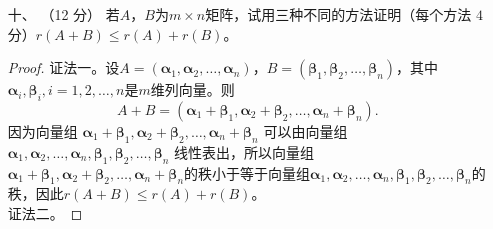\begin{enumerate}[1~]
\begin{proof}
任取一个向量$\boldsymbol{\alpha}\in V_{\lambda}$，有\[
(\mathscr{A}-\lambda E)^{k}(\mathscr{A}\boldsymbol{\alpha})=\mathscr{A}(\mathscr{A}-\lambda E)^{k}\boldsymbol{\alpha}=0.
\]
因此$\mathscr{A}\boldsymbol{\alpha}\in V_{\lambda}$，所以$V_{\lambda}$为$\mathscr{A}$的不变子空间。

(3) 先证明$\lambda$是$\mathscr{A}$在$V_{\lambda}$上的特征值。这只需证明$\Ker(\mathscr{A}-\lambda E)\subset V_{\lambda}$。注意到对任意的$k\ge 1$，\[
\Ker(\mathscr{A}-\lambda E)\subset \Ker(\mathscr{A}-\lambda E)^k.
\]
因此，$\Ker(\mathscr{A}-\lambda E)\subset V_{\lambda}$。\\
再设存在复数$\mu\ne\lambda$是$\mathscr{A}$在$V_{\lambda}$上的特征值。因为对任意的$k\ge 1$，$x-\mu$与$(x-\lambda)^k$互素，因此存在$f(x), g(x)\in\mathbb{C}[x]$，使得\[
f(x)(x-\mu)+g(x)(x-\lambda)^k=1.
\]
任取一个$\mathscr{A}$的属于$\mu$的特征向量$\u$，由 Hamilton-Cayley 定理得\[
\u=f(\mathscr{A})(\mathscr{A}-\mu E)\u+g(\mathscr{A})(\mathscr{A}-\lambda E)\u=0+0=0.
\]
这与$\u$是特征向量矛盾。因此，$\mathscr{A}$在$V_{\lambda}$上没有与$\lambda$不同的特征值。
\end{proof}

\item[十、]（12 分）
若$A$，$B$为$m\times n$矩阵，试用三种不同的方法证明（每个方法 $4$ 分）$r ( A + B ) \le r ( A ) + r ( B ) $。
\begin{proof}
证法一。设$A=(\boldsymbol{\alpha}_1, \boldsymbol{\alpha}_2, \dots, \boldsymbol{\alpha}_n)$，$B=(\boldsymbol{\beta}_1, \boldsymbol{\beta}_2, \dots, \boldsymbol{\beta}_n)$，其中$\boldsymbol{\alpha}_i, \boldsymbol{\beta}_i, i=1, 2, \dots, n$是$m$维列向量。则\[
A+B=(\boldsymbol{\alpha}_1+\boldsymbol{\beta}_1, \boldsymbol{\alpha}_2+\boldsymbol{\beta}_2, \dots, \boldsymbol{\alpha}_n+\boldsymbol{\beta}_n).
\]
因为向量组 $\boldsymbol{\alpha}_1+\boldsymbol{\beta}_1, \boldsymbol{\alpha}_2+\boldsymbol{\beta}_2, \dots, \boldsymbol{\alpha}_n+\boldsymbol{\beta}_n$ 可以由向量组 $\boldsymbol{\alpha}_1, \boldsymbol{\alpha}_2, \dots, \boldsymbol{\alpha}_n, \boldsymbol{\beta}_1, \boldsymbol{\beta}_2, \dots, \boldsymbol{\beta}_n$ 线性表出，所以向量组$\boldsymbol{\alpha}_1+\boldsymbol{\beta}_1, \boldsymbol{\alpha}_2+\boldsymbol{\beta}_2, \dots, \boldsymbol{\alpha}_n+\boldsymbol{\beta}_n$的秩小于等于向量组$\boldsymbol{\alpha}_1, \boldsymbol{\alpha}_2, \dots, \boldsymbol{\alpha}_n, \boldsymbol{\beta}_1, \boldsymbol{\beta}_2, \dots, \boldsymbol{\beta}_n$的秩，因此$r(A+B)\le r(A)+r(B)$。\\
证法二。
\end{proof}
\end{enumerate}
\endinput